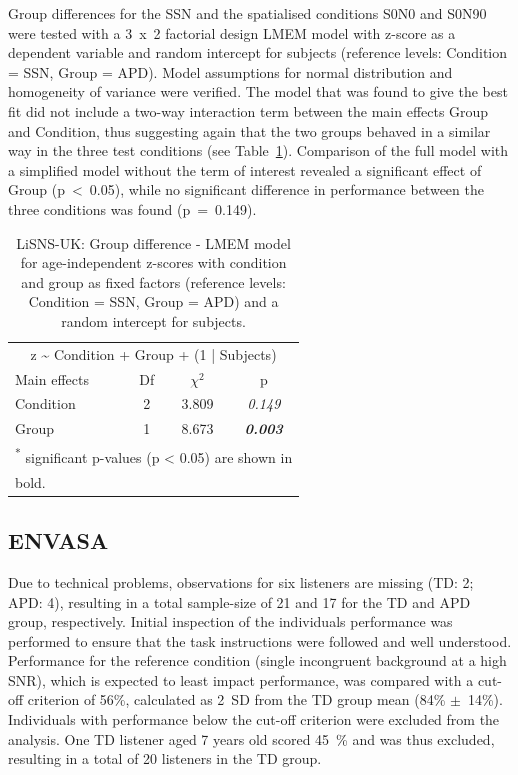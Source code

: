 \documentclass[a4paper, twoside]{templates/ociamthesis}
\begin{document}
Group differences for the SSN and the spatialised conditions S0N0 and S0N90 were tested with a 3~x~2 factorial design LMEM model with z-score as a dependent variable and random intercept for subjects (reference levels: Condition = SSN, Group = APD). Model assumptions for normal distribution and homogeneity of variance were verified. The model that was found to give the best fit did not include a two-way interaction term between the main effects Group and Condition, thus suggesting again that the two groups behaved in a similar way in the three test conditions (see Table~\ref{tab:LiSNS-zLMEMTab}). Comparison of the full model with a simplified model without the term of interest revealed a significant effect of Group (p~\textless~0.05), while no significant difference in performance between the three conditions was found (p~=~0.149).\\

\begin{table}

\caption{\label{tab:LiSNS-zLMEMTab}LiSNS-UK: Group difference - LMEM model for age-independent z-scores with condition and group as fixed factors (reference levels: Condition = SSN, Group = APD) and a random intercept for subjects.}
\centering
\begin{tabular}[t]{lcc>{}c}
\toprule
\multicolumn{4}{c}{z \textasciitilde{} Condition + Group + (1 | Subjects)} \\
\cmidrule(l{3pt}r{3pt}){1-4}
Main effects & Df & $\chi^{2}$ & p\\
\midrule
Condition & 2 & 3.809 & \em{0.149}\\
Group & 1 & 8.673 & \em{\textbf{0.003}}\\
\bottomrule
\multicolumn{4}{l}{\textsuperscript{*} significant p-values (p < 0.05) are shown in}\\
\multicolumn{4}{l}{bold.}\\
\end{tabular}
\end{table}

\hypertarget{envasa}{%
\subsection{ENVASA}\label{envasa}}

Due to technical problems, observations for six listeners are missing (TD: 2; APD: 4), resulting in a total sample-size of 21 and 17 for the TD and APD group, respectively. Initial inspection of the individuals performance was performed to ensure that the task instructions were followed and well understood. Performance for the reference condition (single incongruent background at a high SNR), which is expected to least impact performance, was compared with a cut-off criterion of 56\%, calculated as 2~SD from the TD group mean (84\% \(\pm\)~14\%). Individuals with performance below the cut-off criterion were excluded from the analysis. One TD listener aged 7 years old scored 45~\% and was thus excluded, resulting in a total of 20 listeners in the TD group.
\end{document}

